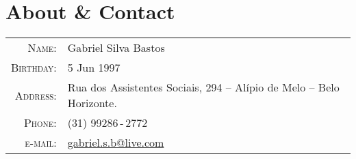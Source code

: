 \documentclass[a4paper,10pt]{article}
\renewcommand\#{\protect\scalebox{0.8}{\protect\raisebox{0.4ex}{\char"0023}}}
\begin{document}
\pagestyle{empty} %

\par{
  \bigskip
  \par
}

\section{About {\normalfont\&} Contact}

\begin{tabular}{rl}
  \textsc{Name:}     & Gabriel Silva Bastos \\
  \textsc{Birthday:} & 5 Jun 1997 \\
  \textsc{Address:}  & Rua dos Assistentes Sociais, 294 -- Alípio de Melo -- Belo Horizonte. \\
  \textsc{Phone:}    & (31) 99286\,-\,2772 \\
  \textsc{e-mail:}   & \href{mailto:gabriel.s.b@live.com}{gabriel.s.b@live.com}
\end{tabular}
\end{document}

